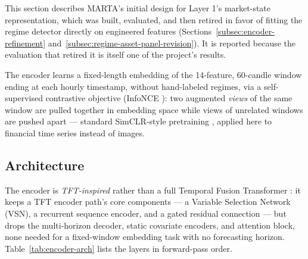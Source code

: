 This section describes MARTA's initial design for Layer 1's market-state representation, which was built, evaluated, and then retired in favor of fitting the regime detector directly on engineered features (Sections~\ref{subsec:encoder-refinement} and~\ref{subsec:regime-asset-panel-revision}). It is reported because the evaluation that retired it is itself one of the project's results.

The encoder learns a fixed-length embedding of the 14-feature, 60-candle window ending at each hourly timestamp, without hand-labeled regimes, via a self-supervised contrastive objective (InfoNCE \cite{infonce2018}): two augmented \emph{views} of the same window are pulled together in embedding space while views of unrelated windows are pushed apart --- standard SimCLR-style pretraining \cite{simclr2020}, applied here to financial time series instead of images.

\subsection{Architecture}
\label{subsec:encoder-architecture}

The encoder is \emph{TFT-inspired} rather than a full Temporal Fusion Transformer \cite{tft2019}: it keeps a TFT encoder path's core components --- a Variable Selection Network (VSN), a recurrent sequence encoder, and a gated residual connection --- but drops the multi-horizon decoder, static covariate encoders, and attention block, none needed for a fixed-window embedding task with no forecasting horizon. Table~\ref{tab:encoder-arch} lists the layers in forward-pass order.


